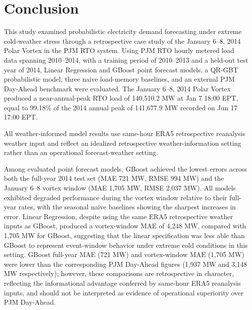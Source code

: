 \documentclass[12pt,a4paper]{article}
\begin{document}
\section{Conclusion}
This study examined probabilistic electricity demand forecasting under extreme cold-weather stress through a retrospective case study of the January 6–8, 2014 Polar Vortex in the PJM RTO system. Using PJM RTO hourly metered load data spanning 2010–2014, with a training period of 2010–2013 and a held-out test year of 2014, Linear Regression and GBoost point forecast models, a QR-GBT probabilistic model, three naive load-memory baselines, and an external PJM Day-Ahead benchmark were evaluated. The January 6–8, 2014 Polar Vortex produced a near-annual-peak RTO load of 140,510.2 MW at Jan 7 18:00 EPT, equal to 99.18\% of the 2014 annual peak of 141,677.9 MW recorded on Jun 17 17:00 EPT. 

All weather-informed model results use same-hour ERA5 retrospective reanalysis weather input and reflect an idealized retrospective weather-information setting rather than an operational forecast-weather setting.




Among evaluated point forecast models, GBoost achieved the lowest errors across both the full-year 2014 test set (MAE 721 MW, RMSE 994 MW) and the January 6–8 vortex window (MAE 1,705 MW, RMSE 2,037 MW). All models exhibited degraded performance during the vortex window relative to their full-year rates, with the seasonal naive baselines showing the sharpest increases in error. Linear Regression, despite using the same ERA5 retrospective weather inputs as GBoost, produced a vortex-window MAE of 4,248 MW, compared with 1,705 MW for GBoost, suggesting that the linear specification was less able than GBoost to represent event-window behavior under extreme cold conditions in this setting. GBoost full-year MAE (721 MW) and vortex-window MAE (1,705 MW) were lower than the corresponding PJM Day-Ahead figures (1,937 MW and 3,148 MW respectively); however, these comparisons are retrospective in character, reflecting the informational advantage conferred by same-hour ERA5 reanalysis inputs, and should not be interpreted as evidence of operational superiority over PJM Day-Ahead.
\end{document}
